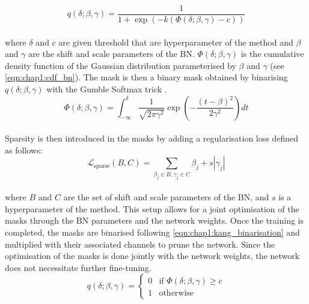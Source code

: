 \begin{equation}
  q(\delta;\beta,\gamma) = \frac{1}{1 +\exp ( - k (\Phi(\delta;\beta,\gamma)-c))}
\end{equation}\\

\noindent where $\delta$ and $c$ are given threshold that are hyperparameter of
the method and $\beta$ and $\gamma$ are the shift and scale parameters of the
\ac{BN}. $\Phi(\delta;\beta,\gamma)$ is the cumulative density function of the
Gaussian distribution parameterised by $\beta$ and $\gamma$ (see \cref{eqn:chap1:cdf_bn}). The mask is then a
binary mask obtained by binarising $q(\delta;\beta,\gamma)$ with the Gumble
Softmax trick \cite{DBLP:conf/iclr/JangGP17}.\\

\begin{equation}
  \label{eqn:chap1:cdf_bn}
  \Phi(\delta;\beta,\gamma) = \int_{-\infty}^{\delta} \frac{1}{\sqrt{2\pi\gamma^2}} \exp( - \frac{(t-\beta)^2}{2\gamma^2} ) dt 
\end{equation}\\

\noindent Sparsity is then introduced in the masks by adding a regularisation
loss defined as follows:\\ 

\begin{equation}
 \mathcal{L}_{\text{{sparse}}}(B, C) = \sum_{\beta_j \in B, \gamma_j \in C} \beta_j + s|\gamma_j|
\end{equation}\\

\noindent where $B$ and $C$ are the set of shift and scale parameters of the
\ac{BN}, and $s$ is a hyperparameter of the method. This setup allows for a
joint optimisation of the masks through the \ac{BN} parameters and the network
weights. Once the training is completed, the masks are binarised following
\cref{eqn:chap1:kang_binarisation} and multiplied with their associated channels
to prune the network. Since the optimisation of the masks is done jointly with
the network weights, the network does not necessitate further fine-tuning.\\


\begin{equation}
  \label{eqn:chap1:kang_binarisation}
  q(\delta;\beta,\gamma) = \begin{cases}
    0 & \text{if } \Phi(\delta;\beta,\gamma) \geq c \\
    1 & \text{otherwise}
  \end{cases}
\end{equation}\\


